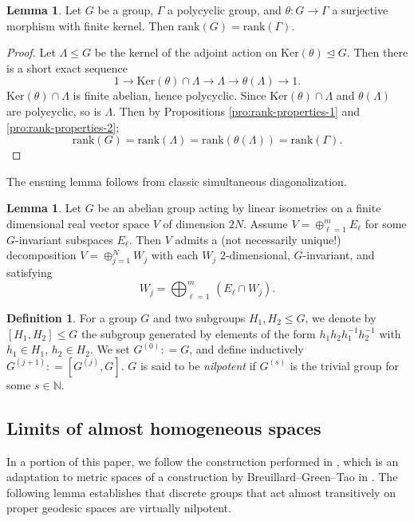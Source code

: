 \documentclass[12pt]{amsart}
\theoremstyle{definition}
\def\fnum{equation}
\newtheorem{lemma}[\fnum]{Lemma}
\newtheorem{definition}[\fnum]{Definition}
\numberwithin{equation}{section}
\newcommand{\Ker}{{\text{Ker}}}
\newcommand{\rank}{{\text{rank}}}
\begin{document}
\begin{lemma}\label{lem:b1-compute}
    Let $G$ be a group, $\Gamma $ a  polycyclic group, and $ \theta :  G \to \Gamma  $ a surjective morphism with finite kernel. Then $ \rank (G) =  \rank (\Gamma )$.  
\end{lemma}

\begin{proof}
Let $\Lambda \leq G$ be the kernel of the adjoint action on $\Ker ( \theta ) \trianglelefteq G $. Then there is a short exact sequence
\[  1 \to \Ker (\theta ) \cap \Lambda \to \Lambda \to \theta (\Lambda) \to 1.   \]
$\Ker (\theta) \cap \Lambda $ is finite abelian, hence polycyclic. Since $\Ker (\theta) \cap \Lambda$ and $\theta (\Lambda )$ are polycyclic,  so is $\Lambda$. Then by Propositions \ref{pro:rank-properties-1} and \ref{pro:rank-properties-2};
    \[   \rank (G) = \rank (\Lambda ) = \rank (\theta (\Lambda) ) = \rank (\Gamma ) .                   \]
\end{proof}

The ensuing lemma follows from classic simultaneous diagonalization.

\begin{lemma}\label{lem:simultaneous-diagonalization}
    Let $G$ be an abelian group acting by linear isometries on a finite dimensional real vector space $V$ of dimension $2N$. Assume $V = \oplus _{\ell = 1}^m E_{\ell} $ for some $G$-invariant subspaces $E_{\ell}$. Then  $V$ admits a (not necessarily unique!) decomposition  $   V = \oplus _{j = 1 }^N W_j  $ with each $W_j$ 2-dimensional, $G$-invariant, and satisfying
    \[   W_j = \bigoplus _{\ell = 1 }^m \, ( E_{\ell } \cap W_j ) .  \]
\end{lemma}

\begin{definition}
For a group $G$ and two subgroups $H_1, H_2 \leq G$, we denote by $[H_1, H_2] \leq G$ the subgroup generated by elements of the form $h_1h_2 h_1^{-1} h_2 ^{-1}$ with $h_1 \in H_1$, $h_2 \in H_2$. We set $G^{(0)} : = G$,  and define inductively $G^{(j + 1 )} : = [G^{(j)} , G]$. $G$ is said to be \emph{nilpotent} if $G^{(s)}$ is the trivial group for some $s \in \mathbb{N}$.
\end{definition}



\subsection{Limits of almost homogeneous spaces}
In a portion of this paper, we follow the construction performed in \cite{zamora-limits}, which is an adaptation to metric spaces of a construction by Breuillard--Green--Tao in \cite{breuillard-green-tao}. The following lemma establishes that discrete groups that act almost transitively on proper geodesic spaces are virtually nilpotent.
\end{document}
